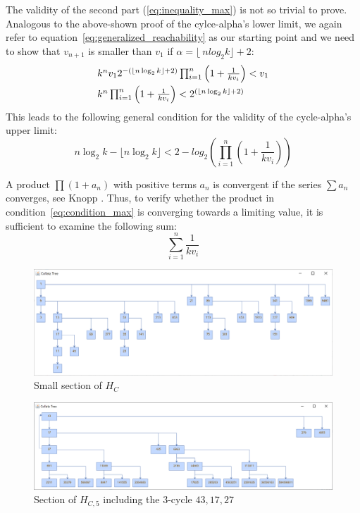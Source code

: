 \documentclass{SciPress_2015}
\begin{document}
The validity of the second part (\ref{eq:inequality_max}) is not so trivial to prove. Analogous to the above-shown proof of the cylce-alpha's lower limit, we again refer to equation~\ref{eq:generalized_reachability} as our starting point and we need to show that $v_{n+1}$ is smaller than $v_1$ if $\alpha=\lfloor\ nlog_2k\rfloor+2$:
\begin{equation*}
\begin{array}{l}
k^nv_12^{-\left(\lfloor n\log_2k\rfloor+2\right)}\prod_{i=1}^{n}\left(1+\frac{1}{kv_{i}}\right)<v_1
\\[\medskipamount]
k^n\prod_{i=1}^{n}\left(1+\frac{1}{kv_{i}}\right)<2^{\left(\lfloor n\log_2k\rfloor+2\right)}
\end{array}	
\end{equation*}
This leads to the following general condition for the validity of the cycle-alpha's upper limit:
\begin{equation}
\label{eq:condition_max}
n\log_2k-\lfloor n\log_2k\rfloor<2-log_2\left(\prod_{i=1}^{n}\left(1+\frac{1}{kv_{i}}\right)\right)
\end{equation}

A product $\prod(1+a_n)$ with positive terms $a_n$ is convergent if the series $\sum a_n$ converges, see Knopp \cite[p.~220]{Ref_Knopp}. Thus, to verify whether the product in condition~\ref{eq:condition_max} is converging towards a limiting value, it is sufficient to examine the following sum:
\begin{equation*}
\sum_{i=1}^{n}\frac{1}{kv_{i}}
\end{equation*}

\begin{figure}
	\includegraphics[width=1.00\textwidth]{figures/h_c.png}
	\caption{Small section of $H_C$}
	\label{fig:1}
\end{figure}

\begin{figure}
	\includegraphics[width=1.00\textwidth]{figures/h_c5a.png}
	\caption{Section of $H_{C,5}$ including the $3$-cycle $43,17,27$}
	\label{fig:2}
\end{figure}
\end{document}
